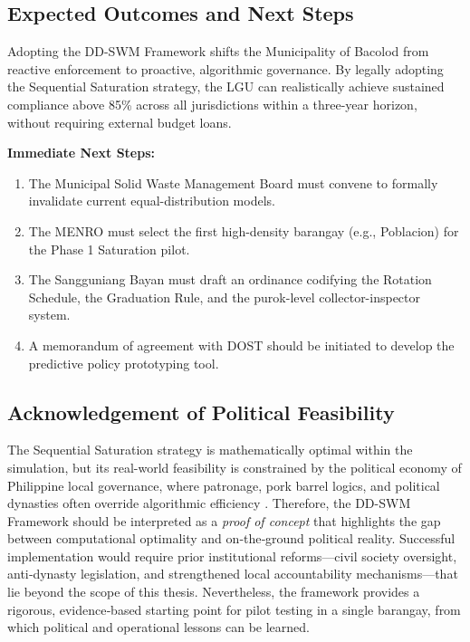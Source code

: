 \subsection*{Expected Outcomes and Next Steps}
Adopting the DD-SWM Framework shifts the Municipality of Bacolod from reactive enforcement to proactive, algorithmic governance. By legally adopting the Sequential Saturation strategy, the LGU can realistically achieve sustained compliance above 85\% across all jurisdictions within a three-year horizon, without requiring external budget loans.

\textbf{Immediate Next Steps:}
\begin{enumerate}
    \item The Municipal Solid Waste Management Board must convene to formally invalidate current equal-distribution models.
    \item The MENRO must select the first high-density barangay (e.g., Poblacion) for the Phase 1 Saturation pilot.
    \item The Sangguniang Bayan must draft an ordinance codifying the Rotation Schedule, the Graduation Rule, and the purok-level collector-inspector system.
    \item A memorandum of agreement with DOST should be initiated to develop the predictive policy prototyping tool.
\end{enumerate}

\subsection*{Acknowledgement of Political Feasibility}
The Sequential Saturation strategy is mathematically optimal within the simulation, but its real-world feasibility is constrained by the political economy of Philippine local governance, where patronage, pork barrel logics, and political dynasties often override algorithmic efficiency \citep{Carpio2025a,IBON2026,PIDS2024}. Therefore, the DD-SWM Framework should be interpreted as a \textit{proof of concept} that highlights the gap between computational optimality and on‑the‑ground political reality. Successful implementation would require prior institutional reforms—civil society oversight, anti‑dynasty legislation, and strengthened local accountability mechanisms—that lie beyond the scope of this thesis. Nevertheless, the framework provides a rigorous, evidence‑based starting point for pilot testing in a single barangay, from which political and operational lessons can be learned.


